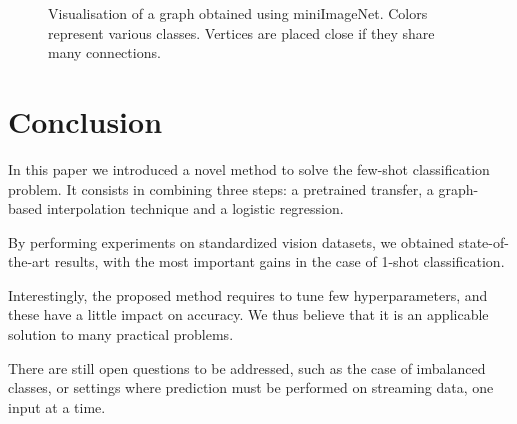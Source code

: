\documentclass[a4paper,conference]{IEEEtran}
\begin{document}
\begin{figure}[h]
\begin{center}
\end{center}
\caption{Visualisation of a graph obtained using miniImageNet. Colors represent various classes. Vertices are placed close if they share many connections.}
\label{graphvisu}
\end{figure}






\section{Conclusion}
\label{sec:con}
In this paper we introduced a novel method to solve the few-shot classification problem. It consists in combining three steps: a pretrained transfer, a graph-based interpolation technique and a logistic regression.

By performing experiments on standardized vision datasets, we obtained state-of-the-art results, with the most important gains in the case of 1-shot classification.

Interestingly, the proposed method requires to tune few hyperparameters, and these have a little impact on accuracy. We thus believe that it is an applicable solution to many practical problems.

There are still open questions to be addressed, such as the case of imbalanced classes, or settings where prediction must be performed on streaming data, one input at a time.



















\end{document}
